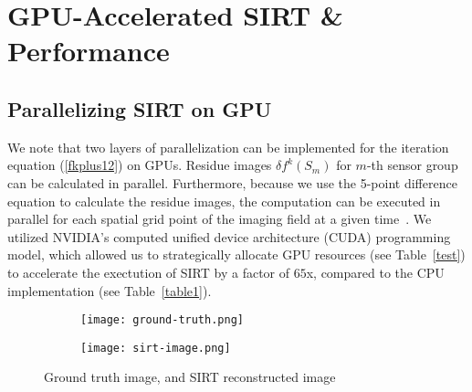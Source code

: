 \documentclass{sig-alternate}
\begin{document}
\section{GPU-Accelerated SIRT \&\\Performance}



\subsection{Parallelizing SIRT on GPU}
We note that two layers of parallelization can be implemented for the iteration equation (\ref{fkplus12}) on GPUs. Residue images $\delta f^k(S_m)$ for $m$-th sensor group can be calculated in parallel. Furthermore, because we use the 5-point difference equation to calculate the residue images, the computation can be executed in parallel for each spatial grid point of the imaging field at a given time~\cite{Bello13,bello14,Bello12}. We utilized NVIDIA's computed unified device architecture (CUDA) programming model, which allowed us to strategically allocate GPU resources (see Table~\ref{test}) to accelerate the exectution of SIRT by a factor of $65$x, compared to the CPU implementation (see Table~\ref{table1}).

\begin{figure}[th]
\centering
\begin{subfigure}
    \centering
    \texttt{[image: ground-truth.png]}
\end{subfigure}
\begin{subfigure}
    \centering
    \texttt{[image: sirt-image.png]}
\end{subfigure}
\caption{Ground truth image, and SIRT reconstructed image}
\label{image}
\end{figure}
\end{document}
